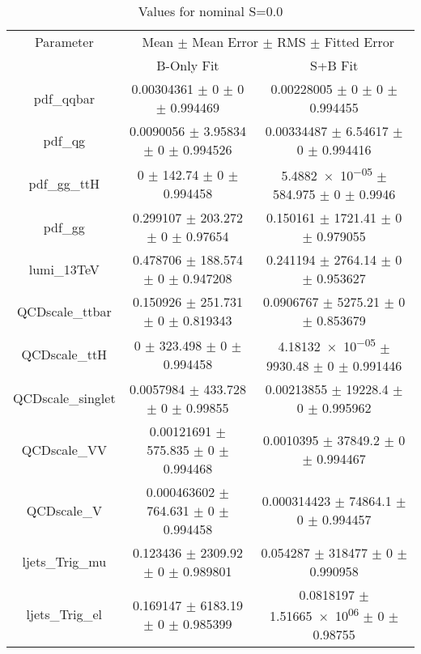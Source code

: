 \begin{table}
\centering
\caption{Values for nominal S=0.0}
\begin{tabular}{ccc}
\toprule
Parameter & \multicolumn{2}{c}{Mean $\pm$ Mean Error $\pm$ RMS $\pm$ Fitted Error}\\
 & B-Only Fit & S+B Fit\\
\midrule
pdf\_qqbar & \num{0.00304361} $\pm$ \num{0} $\pm$ \num{0} $\pm$ \num{0.994469} & \num{0.00228005} $\pm$ \num{0} $\pm$ \num{0} $\pm$ \num{0.994455}\\
pdf\_qg & \num{0.0090056} $\pm$ \num{3.95834} $\pm$ \num{0} $\pm$ \num{0.994526} & \num{0.00334487} $\pm$ \num{6.54617} $\pm$ \num{0} $\pm$ \num{0.994416}\\
pdf\_gg\_ttH & \num{0} $\pm$ \num{142.74} $\pm$ \num{0} $\pm$ \num{0.994458} & \num{5.4882e-05} $\pm$ \num{584.975} $\pm$ \num{0} $\pm$ \num{0.9946}\\
pdf\_gg & \num{0.299107} $\pm$ \num{203.272} $\pm$ \num{0} $\pm$ \num{0.97654} & \num{0.150161} $\pm$ \num{1721.41} $\pm$ \num{0} $\pm$ \num{0.979055}\\
lumi\_13TeV & \num{0.478706} $\pm$ \num{188.574} $\pm$ \num{0} $\pm$ \num{0.947208} & \num{0.241194} $\pm$ \num{2764.14} $\pm$ \num{0} $\pm$ \num{0.953627}\\
QCDscale\_ttbar & \num{0.150926} $\pm$ \num{251.731} $\pm$ \num{0} $\pm$ \num{0.819343} & \num{0.0906767} $\pm$ \num{5275.21} $\pm$ \num{0} $\pm$ \num{0.853679}\\
QCDscale\_ttH & \num{0} $\pm$ \num{323.498} $\pm$ \num{0} $\pm$ \num{0.994458} & \num{4.18132e-05} $\pm$ \num{9930.48} $\pm$ \num{0} $\pm$ \num{0.991446}\\
QCDscale\_singlet & \num{0.0057984} $\pm$ \num{433.728} $\pm$ \num{0} $\pm$ \num{0.99855} & \num{0.00213855} $\pm$ \num{19228.4} $\pm$ \num{0} $\pm$ \num{0.995962}\\
QCDscale\_VV & \num{0.00121691} $\pm$ \num{575.835} $\pm$ \num{0} $\pm$ \num{0.994468} & \num{0.0010395} $\pm$ \num{37849.2} $\pm$ \num{0} $\pm$ \num{0.994467}\\
QCDscale\_V & \num{0.000463602} $\pm$ \num{764.631} $\pm$ \num{0} $\pm$ \num{0.994458} & \num{0.000314423} $\pm$ \num{74864.1} $\pm$ \num{0} $\pm$ \num{0.994457}\\
ljets\_Trig\_mu & \num{0.123436} $\pm$ \num{2309.92} $\pm$ \num{0} $\pm$ \num{0.989801} & \num{0.054287} $\pm$ \num{318477} $\pm$ \num{0} $\pm$ \num{0.990958}\\
ljets\_Trig\_el & \num{0.169147} $\pm$ \num{6183.19} $\pm$ \num{0} $\pm$ \num{0.985399} & \num{0.0818197} $\pm$ \num{1.51665e+06} $\pm$ \num{0} $\pm$ \num{0.98755}\\

\end{tabular}
\end{table}
